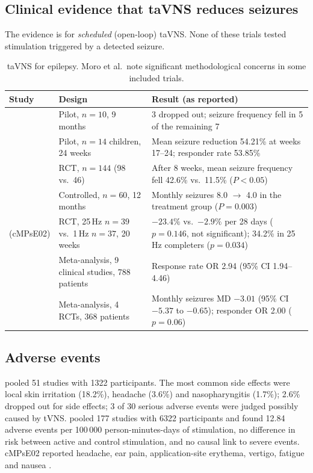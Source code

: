 \documentclass[10pt,a4paper]{article}
\begin{document}
\subsection{Clinical evidence that taVNS reduces seizures}\label{sec:efficacy}
The evidence is for \emph{scheduled} (open-loop) taVNS. None of these trials tested stimulation triggered by a detected
seizure.

\begin{table}[ht]
\centering\small
\begin{tabularx}{\textwidth}{L{3.1cm}L{2.7cm}Y}
\toprule
Study & Design & Result (as reported) \\
\midrule
\textcite{stefan2012} & Pilot, $n=10$, 9 months & 3 dropped out; seizure frequency fell in 5 of the remaining 7 \\
\textcite{he2013} & Pilot, $n=14$ children, 24 weeks & Mean seizure reduction 54.21\% at weeks 17--24; responder rate 53.85\% \\
\textcite{rong2014} & RCT, $n=144$ (98 vs.\ 46) & After 8 weeks, mean seizure frequency fell 42.6\% vs.\ 11.5\% ($P<0.05$) \\
\textcite{aihua2014} & Controlled, $n=60$, 12 months & Monthly seizures 8.0 $\rightarrow$ 4.0 in the treatment group ($P=0.003$) \\
\textcite{bauer2016} (cMPsE02) & RCT, 25\,Hz $n=39$ vs.\ 1\,Hz $n=37$, 20 weeks & $-23.4\%$ vs.\ $-2.9\%$ per 28 days ($p=0.146$, not significant); 34.2\% in 25\,Hz completers ($p=0.034$) \\
\textcite{zhang2024} & Meta-analysis, 9 clinical studies, 788 patients & Response rate OR 2.94 (95\% CI 1.94--4.46) \\
\textcite{moro2025} & Meta-analysis, 4 RCTs, 368 patients & Monthly seizures MD $-3.01$ (95\% CI $-5.37$ to $-0.65$); responder OR 2.00 ($p=0.06$) \\
\bottomrule
\end{tabularx}
\caption{taVNS for epilepsy. Moro et al.\ note significant methodological concerns in some included trials.}
\label{tab:efficacy}
\end{table}

\subsection{Adverse events}\label{sec:ae}
\textcite{redgrave2018} pooled 51 studies with 1322 participants. The most common side effects were local skin
irritation (18.2\%), headache (3.6\%) and nasopharyngitis (1.7\%); 2.6\% dropped out for side effects; 3 of 30 serious
adverse events were judged possibly caused by tVNS. \textcite{kim2022} pooled 177 studies with 6322 participants and
found 12.84 adverse events per 100\,000 person-minutes-days of stimulation, no difference in risk between active and
control stimulation, and no causal link to severe events. cMPsE02 reported headache, ear pain, application-site
erythema, vertigo, fatigue and nausea \parencite{bauer2016}.
\end{document}
